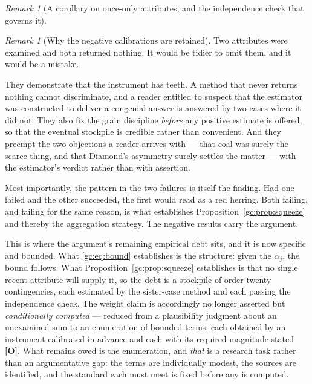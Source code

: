 \documentclass[11pt]{article}
\numberwithin{equation}{section}
\theoremstyle{plain}
\theoremstyle{definition}
\theoremstyle{remark}
\newtheorem{remark}[theorem]{Remark}
\begin{document}
\begin{remark}[A corollary on once-only attributes, and the independence
check that governs it]
\begin{remark}[Why the negative calibrations are retained]
\label{gc:rem:whyretain}
Two attributes were examined and both returned nothing. It would be
tidier to omit them, and it would be a mistake.

They demonstrate that the instrument has teeth. A method that never
returns nothing cannot discriminate, and a reader entitled to suspect
that the estimator was constructed to deliver a congenial answer is
answered by two cases where it did not. They also fix the grain
discipline \emph{before} any positive estimate is offered, so that the
eventual stockpile is credible rather than convenient. And they preempt
the two objections a reader arrives with --- that coal was surely the
scarce thing, and that Diamond's asymmetry surely settles the matter ---
with the estimator's verdict rather than with assertion.

Most importantly, the pattern in the two failures is itself the
finding. Had one failed and the other succeeded, the first would read as
a red herring. Both failing, and failing for the same reason, is what
establishes Proposition~\ref{gc:prop:squeeze} and thereby the
aggregation strategy. The negative results carry the argument.
\end{remark}

This is where the argument's remaining empirical debt sits, and it is
now specific and bounded. What \eqref{gc:eq:bound} establishes is the
structure: given the $\alpha_j$, the bound follows. What
Proposition~\ref{gc:prop:squeeze} establishes is that no single recent
attribute will supply it, so the debt is a stockpile of order twenty
contingencies, each estimated by the sister-case method and each passing
the independence check. The weight claim is accordingly no longer
asserted but \emph{conditionally computed} --- reduced from a
plausibility judgment about an unexamined sum to an enumeration of
bounded terms, each obtained by an instrument calibrated in advance and
each with its required magnitude stated \textbf{[O]}. What remains owed
is the enumeration, and \emph{that} is a research task rather than an
argumentative gap: the terms are individually modest, the sources are
identified, and the standard each must meet is fixed before any is
computed.
\end{remark}
\end{document}
